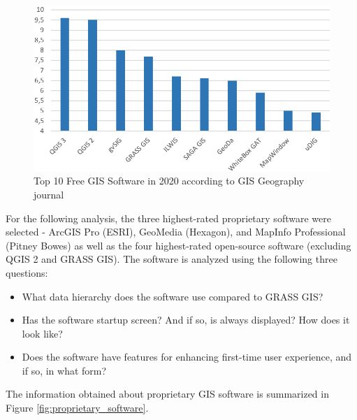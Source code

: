 \documentclass[a4paper,10pt,twoside]{article}
\begin{document}
\begin{figure}[hbt!] 
\begin{center}
\includegraphics[width=13cm]{../pictures/hodnoceni_free.png} 
\caption[Top 10 Free GIS Software in 2020 according to GISGeography journal]{Top 10 Free GIS Software in 2020 according to GIS Geography journal \cite{gisgeography}}
\label{fig:hodnoceni_free}
\end{center}
\end{figure}

\noindent For the following analysis, the three highest-rated
proprietary software were selected - ArcGIS Pro (ESRI), GeoMedia
(Hexagon), and MapInfo Professional (Pitney Bowes) as well as the four
highest-rated open-source software (excluding QGIS 2 and GRASS
GIS). The software is analyzed using the following three questions:

\begin{itemize}
\item What data hierarchy does the software use compared to GRASS GIS?
\item Has the software startup screen? And if so, is always displayed? How does it look like? 
\item Does the software have features for enhancing first-time user experience, and if so, in what form?
\end{itemize}

\noindent The information obtained about proprietary GIS software is
summarized in Figure \ref{fig:proprietary_software}.
\end{document}
